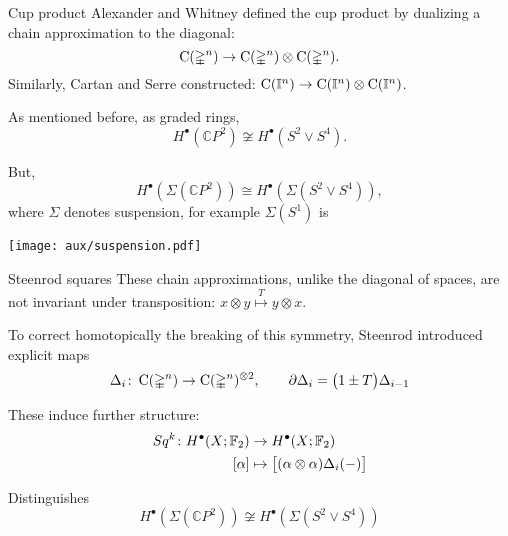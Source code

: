 
\begin{frame}[fragile]{Cup product}
	\pause Alexander and Whitney defined the cup product by dualizing a chain approximation to the diagonal:
	\[
	\operatorname{C}(\mathbb{\Delta}^n) \to \operatorname{C}(\mathbb{\Delta}^n) \otimes \operatorname{C}(\mathbb{\Delta}^n).
	\]
	\pause Similarly, Cartan and Serre constructed: $\operatorname{C}(\mathbb{I}^n) \to \operatorname{C}(\mathbb{I}^n) \otimes \operatorname{C}(\mathbb{I}^n)$.

	\bigskip\pause
	As mentioned before, as graded rings,
	\[
	H^\bullet(\mathbb{C} P^2) \not\cong H^\bullet(S^2 \vee S^4).
	\]

	\vskip -8pt \pause But,
	\[
	H^\bullet(\Sigma(\mathbb{C} P^2)) \cong H^\bullet(\Sigma(S^2 \vee S^4)),
	\]
	where $\Sigma$ denotes suspension, for example $\Sigma(S^1)$ is
	\begin{center}
		\texttt{[image: aux/suspension.pdf]}
	\end{center}
\end{frame}

\begin{frame}{Steenrod squares}
	\pause These chain approximations, unlike the diagonal of spaces, are \textcolor{pblue}{not} invariant under transposition: $x \otimes y \stackrel{T}{\mapsto} y \otimes x$.
	\begin{center}
	\end{center}

	\smallskip\pause To correct homotopically the breaking of this symmetry, Steenrod introduced explicit maps
	\[
	\Delta_i \colon \operatorname{C}(\mathbb{\Delta}^n) \to \operatorname{C}(\mathbb{\Delta}^n)^{\otimes 2},
	\qquad
	\partial \Delta_{i} = \big(1 \pm T \big) \Delta_{i-1}
	\]

	\pause

	These induce further structure:
	\[
	\begin{split}
		Sq^k \colon H^\bullet(X; {\mathbb{F}_2}) &\to H^\bullet(X; {\mathbb{F}_2}) \\
		[\alpha] &\mapsto \big[ (\alpha \otimes \alpha) \Delta_i(-) \big]
	\end{split}
	\]

	\vskip-5pt\pause

	\textcolor{pblue}{Distinguishes}
	\[
	H^\bullet(\Sigma(\mathbb{C} P^2)) \not\cong H^\bullet(\Sigma(S^2 \vee S^4))
	\]
\end{frame}

